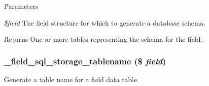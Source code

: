 \begin{DoxyParams}{Parameters}
\item[{\em \$field}]The field structure for which to generate a database schema. \end{DoxyParams}
\begin{DoxyReturn}{Returns}
One or more tables representing the schema for the field. 
\end{DoxyReturn}
\hypertarget{field__sql__storage_8module_acf3b24c3e8026009fd962f450c5228ee}{
\subsubsection[{\_\-field\_\-sql\_\-storage\_\-tablename}]{\setlength{\rightskip}{0pt plus 5cm}\_\-field\_\-sql\_\-storage\_\-tablename (\$ {\em field})}}
\label{field__sql__storage_8module_acf3b24c3e8026009fd962f450c5228ee}
Generate a table name for a field data table.


